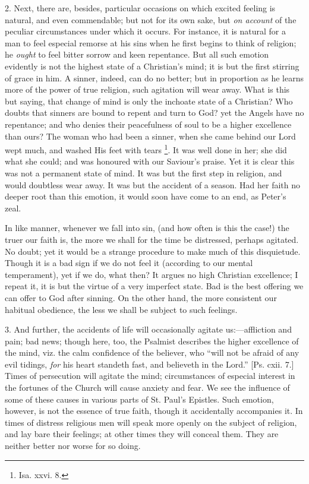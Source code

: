 2. Next, there are, besides, particular occasions on
which excited feeling is natural, and even commendable;
but not for its own sake, but \emph{on account} of the
peculiar circumstances under which it occurs. For
instance, it is natural for a man to feel especial
remorse at his sins when he first begins to think of
religion; he \emph{ought} to feel bitter sorrow and keen
repentance. But all such emotion evidently is not the
highest state of a Christian's mind; it is but the first
stirring of grace in him. A sinner, indeed, can do no
better; but in proportion as he learns more of the power
of true religion, such agitation will wear away. What is
this but saying, that change of mind is only the inchoate
state of a Christian? Who doubts that sinners are bound
to repent and turn to God? yet the Angels have no
repentance; and who denies their peacefulness of soul to
be a higher excellence than ours? The woman who had been
a sinner, when she came behind our Lord wept much, and
washed His feet with tears \footnote{Isa. xxvi. 8.}. It was well
done in her; she did what she could; and was honoured
with our Saviour's praise. Yet it is clear this was not a
permanent state of mind. It was but the first step in
religion, and would doubtless wear away. It was but the
accident of a season. Had her faith no deeper root than
this emotion, it would soon have come to an end, as
Peter's zeal.

In like manner, whenever we fall into sin, (and how
often is this the case!) the truer our faith is, the more
we shall for the time be distressed, perhaps agitated. No
doubt; yet it would be a strange procedure to make much
of this disquietude. Though it is a bad sign if we do not
feel it (according to our mental temperament), yet if we
do, what then? It argues no high Christian excellence; I
repeat it, it is but the virtue of a very imperfect
state. Bad is the best offering we can offer to God after
sinning. On the other hand, the more consistent our
habitual obedience, the less we shall be subject to such
feelings.

3. And further, the accidents of life will
occasionally agitate us:—affliction and pain; bad
news; though here, too, the Psalmist describes the higher
excellence of the mind, viz. the calm confidence of the
believer, who ``will not be afraid of any evil
tidings, \emph{for} his heart standeth fast, and
believeth in the Lord.'' [Ps. cxii. 7.] Times of
persecution will agitate the mind; circumstances of
especial interest in the fortunes of the Church will
cause anxiety and fear. We see the influence of some of
these causes in various parts of St. Paul's Epistles.
Such emotion, however, is not the essence of true faith,
though it accidentally accompanies it. In times of
distress religious men will speak more openly on the
subject of religion, and lay bare their feelings; at
other times they will conceal them. They are neither
better nor worse for so doing.

